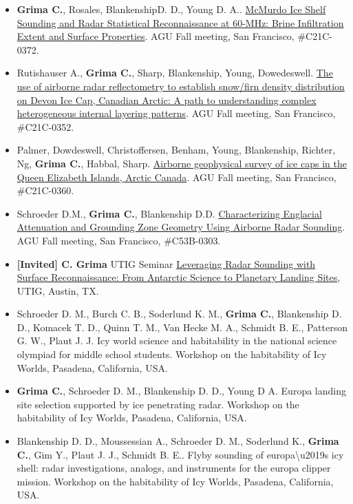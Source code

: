 \begin{itemize}
\item
  \textbf{Grima C.}, Rosales, BlankenshipD. D., Young D. A..
  \href{https://agu.confex.com/agu/fm14/meetingapp.cgi/Paper/22986}{McMurdo
  Ice Shelf Sounding and Radar Statistical Reconnaissance at 60-MHz:
  Brine Infiltration Extent and Surface Properties}. AGU Fall meeting,
  San Francisco, \#C21C-0372.
\item
  Rutishauser A., \textbf{Grima C.}, Sharp, Blankenship, Young,
  Dowedeswell.
  \href{https://agu.confex.com/agu/fm14/meetingapp.cgi/Paper/17159}{The
  use of airborne radar reflectometry to establish snow/firn density
  distribution on Devon Ice Cap, Canadian Arctic: A path to
  understanding complex heterogeneous internal layering patterns}. AGU
  Fall meeting, San Francisco, \#C21C-0352.
\item
  Palmer, Dowdeswell, Christoffersen, Benham, Young, Blankenship,
  Richter, Ng, \textbf{Grima C.}, Habbal, Sharp.
  \href{https://agu.confex.com/agu/fm14/meetingapp.cgi/Paper/15672}{Airborne
  geophysical survey of ice caps in the Queen Elizabeth Islands, Arctic
  Canada}. AGU Fall meeting, San Francisco, \#C21C-0360.
\item
  Schroeder D.M., \textbf{Grima C.}, Blankenship D.D.
  \href{https://agu.confex.com/agu/fm14/meetingapp.cgi/Paper/8154}{Characterizing
  Englacial Attenuation and Grounding Zone Geometry Using Airborne Radar
  Sounding}. AGU Fall meeting, San Francisco, \#C53B-0303.
\item
  \textbf{{[}Invited{]} C. Grima} UTIG Seminar
  \href{http://mediasite.jsg.utexas.edu/UTMediasite/Play/7b4636e8db6844d79de9e32a14f142781d}{Leveraging
  Radar Sounding with Surface Reconnaissance: From Antarctic Science to
  Planetary Landing Sites}, UTIG, Austin, TX.
\item
  Schroeder D. M., Burch C. B., Soderlund K. M., \textbf{Grima C.},
  Blankenship D. D., Komacek T. D., Quinn T. M., Van Hecke M. A.,
  Schmidt B. E., Patterson G. W., Plaut J. J. Icy world science and
  habitability in the national science olympiad for middle school
  students. Workshop on the habitability of Icy Worlds, Pasadena,
  California, USA.
\item
  \textbf{Grima C.}, Schroeder D. M., Blankenship D. D., Young D A.
  Europa landing site selection supported by ice penetrating radar.
  Workshop on the habitability of Icy Worlds, Pasadena, California, USA.
\item
  Blankenship D. D., Moussessian A., Schroeder D. M., Soderlund K.,
  \textbf{Grima C.}, Gim Y., Plaut J. J., Schmidt B. E.. Flyby sounding
  of europa\textbackslash{}u2019s icy shell: radar investigations,
  analogs, and instruments for the europa clipper mission. Workshop on
  the habitability of Icy Worlds, Pasadena, California, USA.
\end{itemize}

